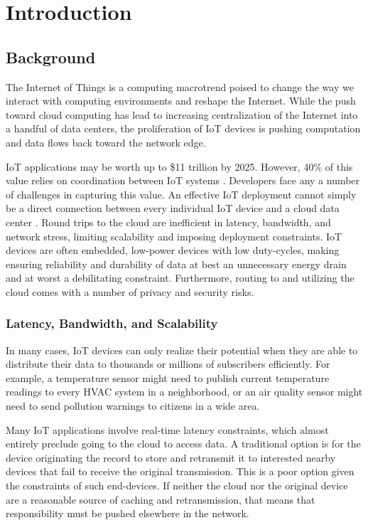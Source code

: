 \chapter{Introduction}
\label{intro}

\section{Background}
\label{background}

The Internet of Things is a computing macrotrend poised to change the way we interact with computing environments and reshape the Internet. While the push toward cloud computing has lead to increasing centralization of the Internet into a handful of data centers, the proliferation of IoT devices is pushing computation and data flows back toward the network edge.

IoT applications may be worth up to \$11 trillion by 2025. However, 40\% of this value relies on coordination between IoT systems \cite{McKinsey}. Developers face any a number of challenges in capturing this value. An effective IoT deployment cannot simply be a direct connection between every individual IoT device and a cloud data center \cite{kubi}. Round trips to the cloud are inefficient in  latency, bandwidth, and network stress, limiting scalability and imposing deployment constraints. IoT devices are often embedded, low-power devices with low duty-cycles, making ensuring reliability and durability of data at best an unnecessary energy drain and at worst a debilitating constraint. Furthermore, routing to and utilizing the cloud comes with a number of privacy and security risks.

\subsection{Latency, Bandwidth, and Scalability}
In many cases, IoT devices can only realize their potential when they are able to distribute their data to thousands or millions of subscribers efficiently. For example, a temperature sensor might need to publish current temperature readings to every HVAC system in a neighborhood, or an air quality sensor might need to send pollution warnings to citizens in a wide area. 

Many IoT applications involve real-time latency constraints, which almost entirely preclude going to the cloud to access data.  A traditional option is for the device originating the record to store and retransmit it to interested nearby devices that fail to receive the original transmission.  This is a poor option given the constraints of such end-devices.  If neither the cloud nor the original device are a reasonable source of caching and retransmission, that means that responsibility must be pushed elsewhere in the network.

